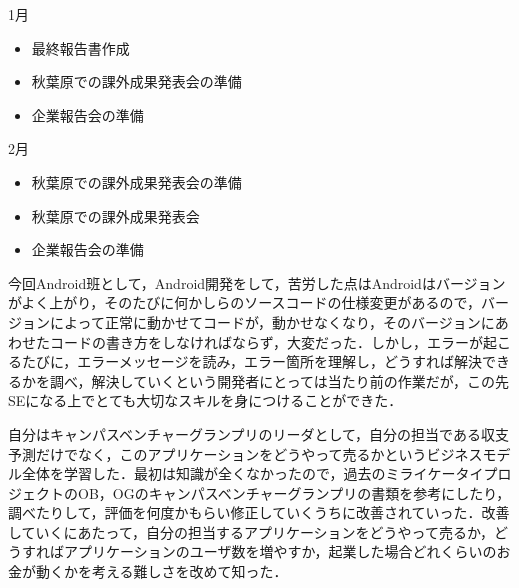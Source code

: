 1月
\begin{itemize}
\item 最終報告書作成
\item 秋葉原での課外成果発表会の準備
\item 企業報告会の準備
\end{itemize}
2月
\begin{itemize}
\item 秋葉原での課外成果発表会の準備
\item 秋葉原での課外成果発表会
\item 企業報告会の準備
\end{itemize}
\par
今回Android班として，Android開発をして，苦労した点はAndroidはバージョンがよく上がり，そのたびに何かしらのソースコードの仕様変更があるので，バージョンによって正常に動かせてコードが，動かせなくなり，そのバージョンにあわせたコードの書き方をしなければならず，大変だった．しかし，エラーが起こるたびに，エラーメッセージを読み，エラー箇所を理解し，どうすれば解決できるかを調べ，解決していくという開発者にとっては当たり前の作業だが，この先SEになる上でとても大切なスキルを身につけることができた．
\par
自分はキャンパスベンチャーグランプリのリーダとして，自分の担当である収支予測だけでなく，このアプリケーションをどうやって売るかというビジネスモデル全体を学習した．最初は知識が全くなかったので，過去のミライケータイプロジェクトのOB，OGのキャンパスベンチャーグランプリの書類を参考にしたり，調べたりして，評価を何度かもらい修正していくうちに改善されていった．改善していくにあたって，自分の担当するアプリケーションをどうやって売るか，どうすればアプリケーションのユーザ数を増やすか，起業した場合どれくらいのお金が動くかを考える難しさを改めて知った．

